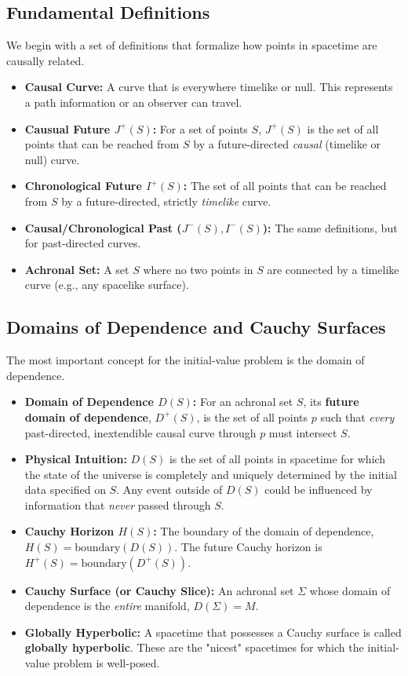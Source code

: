 \documentclass[11pt, a4paper]{report}
\begin{document}
\subsection*{Fundamental Definitions}
We begin with a set of definitions that formalize how points in spacetime are causally related.
\begin{itemize}
    \item \textbf{Causal Curve:} A curve that is everywhere timelike or null. This represents a path information or an observer can travel.
    \item \textbf{Causual Future $J^+(S)$:} For a set of points $S$, $J^+(S)$ is the set of all points that can be reached from $S$ by a future-directed \emph{causal} (timelike or null) curve.
    \item \textbf{Chronological Future $I^+(S)$:} The set of all points that can be reached from $S$ by a future-directed, strictly \emph{timelike} curve.
    \item \textbf{Causal/Chronological Past ($J^-(S), I^-(S)$):} The same definitions, but for past-directed curves.
    \item \textbf{Achronal Set:} A set $S$ where no two points in $S$ are connected by a timelike curve (e.g., any spacelike surface).
\end{itemize}

\subsection*{Domains of Dependence and Cauchy Surfaces}
The most important concept for the initial-value problem is the domain of dependence.

\begin{itemize}
    \item \textbf{Domain of Dependence $D(S)$:} For an achronal set $S$, its \textbf{future domain of dependence}, $D^+(S)$, is the set of all points $p$ such that \emph{every} past-directed, inextendible causal curve through $p$ must intersect $S$.
    \item \textbf{Physical Intuition:} $D(S)$ is the set of all points in spacetime for which the state of the universe is completely and uniquely determined by the initial data specified on $S$. Any event outside of $D(S)$ could be influenced by information that \emph{never} passed through $S$.
    \item \textbf{Cauchy Horizon $H(S)$:} The boundary of the domain of dependence, $H(S) = \text{boundary}(D(S))$. The future Cauchy horizon is $H^+(S) = \text{boundary}(D^+(S))$.
    \item \textbf{Cauchy Surface (or Cauchy Slice):} An achronal set $\Sigma$ whose domain of dependence is the \emph{entire} manifold, $D(\Sigma) = M$.
    \item \textbf{Globally Hyperbolic:} A spacetime that possesses a Cauchy surface is called \textbf{globally hyperbolic}. These are the "nicest" spacetimes for which the initial-value problem is well-posed.
\end{itemize}
\end{document}
